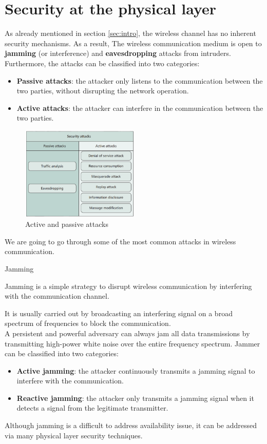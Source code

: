 \chapter{Security at the physical layer}
As already mentioned in section \ref{sec:intro}, the wireless channel has no inherent security mechanisms. 
As a result, The wireless communication medium is open to \textbf{jamming} (or interference) and 
\textbf{eavesdropping} attacks from intruders.\\
Furthermore, the attacks can be classified into two categories: 
\begin{itemize}
    \item \textbf{Passive attacks}: the attacker only listens to the communication between the 
      two parties, without disrupting the network operation.
    \item \textbf{Active attacks}: the attacker can interfere in the communication between the 
      two parties.
\end{itemize}
\begin{figure}[H]
    \centering
    \includegraphics[width=0.5\textwidth]{img/wireless/attack classification.png}
    \caption{Active and passive attacks}
    \label{fig:active_passive_attacks}
\end{figure}
We are going to go through some of the most common attacks in wireless communication.
\begin{section}{Jamming}
   \begin{boxH}
     Jamming is a simple strategy to disrupt wireless communication by interfering with the
     communication channel.
    \end{boxH}
    It is usually carried out by broadcasting an interfering signal on a broad spectrum of frequencies
    to block the communication.\\
    A persistent and powerful adversary can always jam all data transmissions by transmitting 
    high-power white noise over the entire frequency spectrum.
    Jammer can be classified into two categories:
    \begin{itemize}
      \item \textbf{Active jamming}: the attacker continuously transmits a jamming signal to 
        interfere with the communication.
      \item \textbf{Reactive jamming}: the attacker only transmits a jamming signal when it
        detects a signal from the legitimate transmitter.
    \end{itemize}
    Although jamming is a difficult to address availability issue, it can be addressed via many
    physical layer security techniques.
    \end{section}
